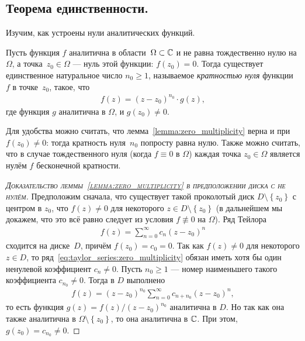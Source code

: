 \documentclass[../complex-analysis.tex]{subfiles}
\begin{document}
\subsection{Теорема единственности.}

Изучим, как устроены нули аналитических функций.

\begin{lm}
 \label{lemma:zero_multiplicity}
 Пусть функция $ f $  аналитична в области~$ \Omega \subset \mathbb{C} $ и не равна тождественно нулю на $ \Omega $, а точка~$ z_0 \in \Omega $ --- нуль этой функции: $ f(z_0) = 0 $. Тогда существует единственное натуральное число $ n_0 \geqslant 1 $, называемое \emph{кратностью нуля} функции~$ f $ в точке~$ z_0 $, такое, что
 \begin{align*}
  f(z) = (z - z_0)^{n_0} \cdot g(z),
 \end{align*} где функция $ g $ аналитична в $ \Omega $, и $ g(z_0) \neq 0 $.
\end{lm}
Для удобства можно считать, что лемма~\ref{lemma:zero_multiplicity} верна и при $ f(z_0) \neq 0 $: тогда кратность нуля~$ n_0 $ попросту равна нулю. Также можно считать, что в случае тождественного нуля (когда $ f \equiv 0 $ в $ \Omega $) каждая точка $ z_0 \in \Omega $ является нулём $ f $ бесконечной кратности.
\begin{proof}[\normalfont\textsc{Доказательство леммы~\ref{lemma:zero_multiplicity} в предположении диска с не нулём}]\item
 Предположим сначала, что существует такой проколотый диск $ D \setminus \left\{ z_0 \right\} $ с центром в $ z_0 $, что $ f(z) \neq 0 $ для некоторого $ z\in D \setminus \left\{ z_0 \right\} $ (в дальнейшем мы докажем, что это всё равно следует из условия $ f \not\equiv 0 $ на $ \Omega $). Ряд Тейлора
 \begin{align}
  \label{eq:taylor_series:zero_multiplicity}
  f(z) = \sum_{n=0}^{\infty}c_n(z-z_0)^{n}
 \end{align} сходится на диске~$ D $, причём $ f(z_0) = c_0 = 0 $. Так как $ f(z) \neq 0 $ для некоторого $ z \in D $, то ряд~\eqref{eq:taylor_series:zero_multiplicity} обязан иметь хотя бы один ненулевой коэффициент $ c_n \neq 0 $. Пусть  $ n_0 \geqslant 1 $  --- номер наименьшего такого коэффициента $ c_{n_0} \neq 0 $.  Тогда в $ D $ выполнено
 \begin{align*}
  f(z) = (z-z_0)^{n_0} \sum_{n=0}^{\infty} c_{n + n_0}(z-z_0)^{n},
 \end{align*} то есть функция $ g(z) = f(z) / (z-z_0)^{n_0} $ аналитична в $ D $. Но так как она также аналитична в $ \Omega \setminus \left\{ z_0 \right\} $, то она аналитична в $ \mathbb{C} $. При этом, $ g(z_0) = c_{n_0} \neq 0 $.
\end{proof}
\end{document}

